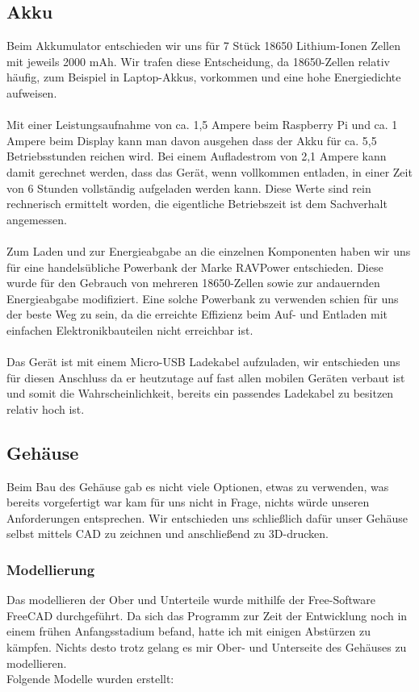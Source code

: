 \subsection{Akku}

Beim Akkumulator entschieden wir uns für 7 Stück 18650 Lithium-Ionen Zellen mit jeweils 2000 mAh. Wir trafen diese Entscheidung, da 18650-Zellen relativ häufig, zum Beispiel in Laptop-Akkus, vorkommen und eine hohe Energiedichte aufweisen.\\
\\
Mit einer Leistungsaufnahme von ca. 1,5 Ampere beim Raspberry Pi und ca. 1 Ampere beim Display kann man davon ausgehen dass der Akku für ca. 5,5 Betriebsstunden reichen wird. Bei einem Aufladestrom von 2,1 Ampere kann damit gerechnet werden, dass das Gerät, wenn vollkommen entladen, in einer Zeit von 6 Stunden vollständig aufgeladen werden kann. Diese Werte sind rein rechnerisch ermittelt worden, die eigentliche Betriebszeit ist dem Sachverhalt angemessen.\\
\\
Zum Laden und zur Energieabgabe an die einzelnen Komponenten haben wir uns für eine handelsübliche Powerbank der Marke RAVPower entschieden. Diese wurde für den Gebrauch von mehreren 18650-Zellen sowie zur andauernden Energieabgabe modifiziert. Eine solche Powerbank zu verwenden schien für uns der beste Weg zu sein, da die erreichte Effizienz beim Auf- und Entladen mit einfachen Elektronikbauteilen nicht erreichbar ist.\\
\\
Das Gerät ist mit einem Micro-USB Ladekabel aufzuladen, wir entschieden uns für diesen Anschluss da er heutzutage auf fast allen mobilen Geräten verbaut ist und somit die Wahrscheinlichkeit, bereits ein passendes Ladekabel zu besitzen relativ hoch ist.\\

\subsection{Gehäuse}

Beim Bau des Gehäuse gab es nicht viele Optionen, etwas zu verwenden, was bereits vorgefertigt war kam für uns nicht in Frage, nichts würde unseren Anforderungen entsprechen. Wir entschieden uns schließlich dafür unser Gehäuse selbst mittels CAD zu zeichnen und anschließend zu 3D-drucken.\\

\subsubsection{Modellierung}
Das modellieren der Ober und Unterteile wurde mithilfe der Free-Software FreeCAD durchgeführt. Da sich das Programm zur Zeit der Entwicklung noch in einem frühen Anfangsstadium befand, hatte ich mit einigen Abstürzen zu kämpfen. Nichts desto trotz gelang es mir Ober- und Unterseite des Gehäuses zu modellieren.\\
Folgende Modelle wurden erstellt:

